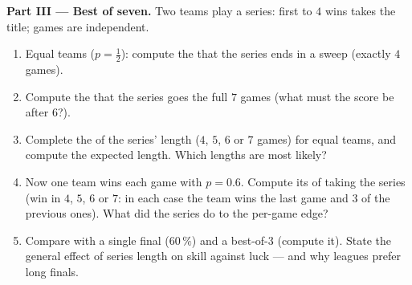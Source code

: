 \begin{problem}
\medskip
\noindent\textbf{Part III --- Best of seven.}
Two teams play a series: first to $4$ wins takes the title;
games are independent.
\begin{enumerate}[resume]
  \item Equal teams ($p = \frac12$): compute the 
        that the series ends in a sweep (exactly $4$ games).
  \item Compute the  that the series goes the full
        $7$ games (what must the score be after $6$?).
  \item Complete the  of the series' length
        ($4$, $5$, $6$ or $7$ games) for equal teams, and
        compute the expected length. Which lengths are most
        likely?
  \item Now one team wins each game with $p = 0.6$. Compute its
         of taking the series (win in $4$, $5$, $6$
        or $7$: in each case the team wins the last game and
        $3$ of the previous ones). What did the series do to
        the per-game edge?
  \item Compare with a single final ($60\,\%$) and a best-of-3
        (compute it). State the general effect of series length
        on skill against luck --- and why leagues prefer long
        finals.
\end{enumerate}


\end{problem}
